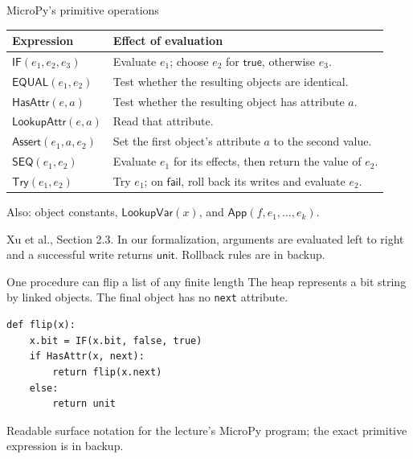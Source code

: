 \documentclass[11pt,aspectratio=169]{beamer}
\newcommand{\unit}{\mathsf{unit}}
\newcommand{\true}{\mathsf{true}}
\newcommand{\false}{\mathsf{false}}
\newcommand{\fail}{\mathsf{fail}}
\newcommand{\op}[1]{\mathsf{#1}}
\newcommand{\source}[1]{\par\vfill{\scriptsize\color{muted}#1\par}}
\begin{document}
\begin{frame}{MicroPy's primitive operations}
\small
\begin{tabular}{@{}p{}p{}@{}}
\toprule
Expression & Effect of evaluation\\
\midrule
$\op{IF}(e_1,e_2,e_3)$ & Evaluate $e_1$; choose $e_2$ for $\true$, otherwise $e_3$.\\[4pt]
$\op{EQUAL}(e_1,e_2)$ & Test whether the resulting objects are identical.\\[4pt]
$\op{HasAttr}(e,a)$ & Test whether the resulting object has attribute $a$.\\[4pt]
$\op{LookupAttr}(e,a)$ & Read that attribute.\\[4pt]
$\op{Assert}(e_1,a,e_2)$ & Set the first object's attribute $a$ to the second value.\\[4pt]
$\op{SEQ}(e_1,e_2)$ & Evaluate $e_1$ for its effects, then return the value of $e_2$.\\[4pt]
$\op{Try}(e_1,e_2)$ & Try $e_1$; on $\fail$, roll back its writes and evaluate $e_2$.\\
\bottomrule
\end{tabular}

Also: object constants, $\op{LookupVar}(x)$, and $\op{App}(f,e_1,\ldots,e_k)$.
\source{Xu et al., Section 2.3. In our formalization, arguments are evaluated
left to right and a successful write returns $\unit$. Rollback rules are in backup.}
\end{frame}

\begin{frame}[fragile]{One procedure can flip a list of any finite length}
The heap represents a bit string by linked objects. The final object has no
\texttt{next} attribute.
\begin{center}
\end{center}
\begin{lstlisting}
def flip(x):
    x.bit = IF(x.bit, false, true)
    if HasAttr(x, next):
        return flip(x.next)
    else:
        return unit
\end{lstlisting}
\source{Readable surface notation for the lecture's MicroPy program;
the exact primitive expression is in backup.}
\end{frame}
\end{document}
